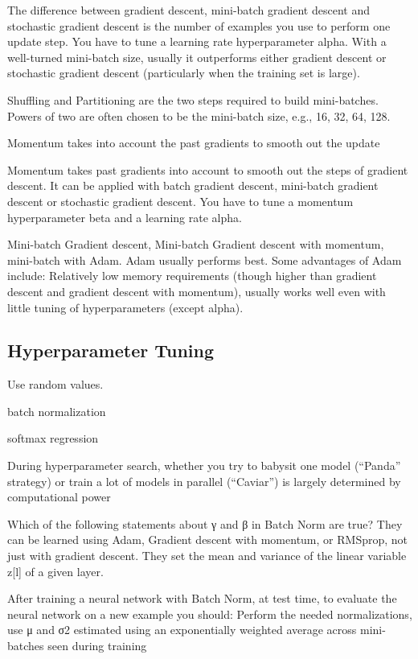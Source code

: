 \documentclass[]{book}
\begin{document}
The difference between gradient descent, mini-batch gradient descent and
stochastic gradient descent is the number of examples you use to perform
one update step. You have to tune a learning rate hyperparameter alpha.
With a well-turned mini-batch size, usually it outperforms either
gradient descent or stochastic gradient descent (particularly when the
training set is large).

Shuffling and Partitioning are the two steps required to build
mini-batches. Powers of two are often chosen to be the mini-batch size,
e.g., 16, 32, 64, 128.

Momentum takes into account the past gradients to smooth out the update

Momentum takes past gradients into account to smooth out the steps of
gradient descent. It can be applied with batch gradient descent,
mini-batch gradient descent or stochastic gradient descent. You have to
tune a momentum hyperparameter beta and a learning rate alpha.

Mini-batch Gradient descent, Mini-batch Gradient descent with momentum,
mini-batch with Adam. Adam usually performs best. Some advantages of
Adam include: Relatively low memory requirements (though higher than
gradient descent and gradient descent with momentum), usually works well
even with little tuning of hyperparameters (except alpha).

\subsection{Hyperparameter Tuning}\label{hyperparameter-tuning}

Use random values.

batch normalization

softmax regression

During hyperparameter search, whether you try to babysit one model
(``Panda'' strategy) or train a lot of models in parallel (``Caviar'')
is largely determined by computational power

Which of the following statements about γ and β in Batch Norm are true?
They can be learned using Adam, Gradient descent with momentum, or
RMSprop, not just with gradient descent. They set the mean and variance
of the linear variable z{[}l{]} of a given layer.

After training a neural network with Batch Norm, at test time, to
evaluate the neural network on a new example you should: Perform the
needed normalizations, use μ and σ2 estimated using an exponentially
weighted average across mini-batches seen during training
\end{document}
